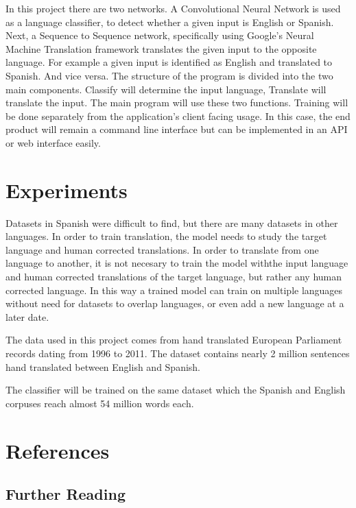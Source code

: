 \documentclass[10pt,a4paper]{report}
\begin{document}
  In this project there are two networks. A Convolutional Neural Network is used as a language classifier, to detect whether a given input is English or Spanish. Next, a Sequence to Sequence network, specifically using Google's Neural Machine Translation framework translates the given input to the opposite language. For example a given input is identified as English and translated to Spanish. And vice versa. The structure of the program is divided into the two main components. Classify will determine the input language, Translate will translate the input. The main program will use these two functions. Training will be done separately from the application's client facing usage. In this case, the end product will remain a command line interface but can be implemented in an API or web interface easily.

\section{Experiments}

  Datasets in Spanish were difficult to find, but there are many datasets in other languages. In order to train translation, the model needs to study the target language and human corrected translations. In order to translate from one language to another, it is not necesary to train the model withthe input language and human corrected translations of the target language, but rather any human corrected language. In this way a trained model can train on multiple languages without need for datasets to overlap languages, or even add a new language at a later date.

  The data used in this project comes from hand translated European Parliament records dating from 1996 to 2011. The dataset contains nearly 2 million sentences hand translated between English and Spanish.

  The classifier will be trained on the same dataset which the Spanish and English corpuses reach almost 54 million words each.

\clearpage

\section{References}

\subsection{Further Reading}
\end{document}
